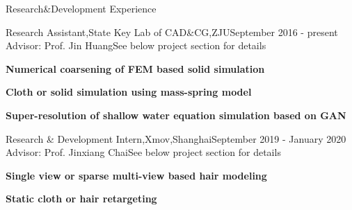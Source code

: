 \documentclass{resume} %
\begin{document}
\begin{rSection}{Research\&Development Experience}

  \begin{rSubsection}{Research Assistant,State Key Lab of CAD\&CG,ZJU}{September 2016 - present}
    {Advisor: Prof. Jin Huang}{See below project section for details}
\item {\bf Numerical coarsening of FEM based solid simulation}
\item {\bf Cloth or solid simulation using mass-spring model} 
\item {\bf Super-resolution of shallow water equation simulation based on GAN}
  \end{rSubsection}
  \begin{rSubsection}{Research \& Development Intern,Xmov,Shanghai}{September 2019 - January 2020}
    {Advisor: Prof. Jinxiang Chai}{See below project section for details}
\item {\bf Single view or sparse multi-view based hair modeling}
\item {\bf Static cloth or hair retargeting} 
  \end{rSubsection}

\end{rSection}
\end{document}
